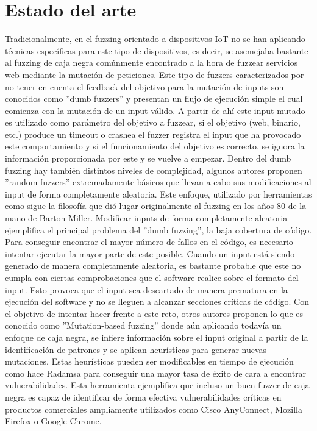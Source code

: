 \chapter{Estado del arte}
\label{estado_del_arte}
Tradicionalmente, en el fuzzing orientado a dispositivos IoT no se han aplicando técnicas
específicas para este tipo de dispositivos, es decir, se asemejaba bastante al fuzzing de caja negra 
comúnmente encontrado a la hora de fuzzear servicios web mediante la mutación de peticiones.
Este tipo de fuzzers caracterizados por no tener en cuenta el feedback del objetivo para la mutación de
inputs son conocidos como ''dumb fuzzers'' y presentan un flujo de ejecución simple el cual comienza 
con la mutación de un input válido.
A partir de ahí este input mutado es utilizado como parámetro del objetivo a fuzzear, si el 
objetivo (web, binario, etc.) produce un timeout o crashea el fuzzer registra el input que 
ha provocado este comportamiento y si el funcionamiento del objetivo es correcto, se ignora 
la información proporcionada por este y se vuelve a empezar. Dentro del dumb fuzzing hay también
distintos niveles de complejidad, algunos autores proponen ''random fuzzers'' extremadamente básicos que 
llevan a cabo sus modificaciones al input de forma completamente aleatoria. Este enfoque, utilizado por 
herramientas como\cite{zzuf} sigue la filosofía que dió lugar originalmente al fuzzing en 
los años 80 de la mano de Barton Miller\cite{Miller1990}. Modificar inputs de forma completamente aleatoria
ejemplifica el principal problema del ''dumb fuzzing'', la baja cobertura de código. Para conseguir encontrar 
el mayor número de fallos en el código, es necesario intentar ejecutar la mayor parte de este posible. Cuando 
un input está siendo generado de manera completamente aleatoria, es bastante probable que este no cumpla con
ciertas comprobaciones que el software realice sobre el formato del input. Esto provoca que el input sea descartado 
de manera prematura en la ejecución del software y no se lleguen a alcanzar secciones críticas de código.
Con el objetivo de intentar hacer frente a este reto, otros autores proponen lo que es 
conocido como ''Mutation-based fuzzing'' donde aún aplicando todavía un enfoque de caja negra, se infiere
información sobre el input original a partir de la identificación de patrones y se aplican heurísticas para generar
nuevas mutaciones. Estas heurísticas pueden ser modificables en tiempo de ejecución como hace Radamsa\cite{radamsa}
para conseguir una mayor tasa de éxito de cara a encontrar vulnerabilidades. Esta herramienta ejemplifica que incluso 
un buen fuzzer de caja negra es capaz de identificar de forma efectiva vulnerabilidades críticas en productos comerciales 
ampliamente utilizados como Cisco AnyConnect, Mozilla Firefox o Google Chrome.

